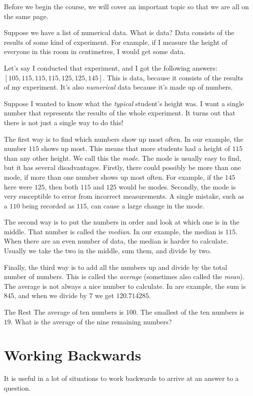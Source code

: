 \documentclass[a4paper,10pt]{report}
\begin{document}
Before we begin the course, we will cover an important topic so that we are all
on the same page.

Suppose we have a list of numerical data. What is data? Data  consists of the
results of some kind of experiment. For example, if I measure the height of
everyone in this room in centimetres, I would get some data.

Let's say I conducted that experiment, and I got the following answers: $[105,
115, 115, 115, 125, 125, 145]$. This is data, because it consists of the results
of my experiment. It's also \emph{numerical} data because it's made up of
numbers.

Suppose I wanted to know what the \emph{typical} student's height was. I want a
single number that represents the results of the whole experiment. It turns out
that there is not just a single way to do this!

The first way is to find which numbers show up most often. In our example, the
number $115$ shows up most. This means that more students had a height of $115$
than any other height. We call this the \emph{mode}. The mode is usually easy to
find, but it has several disadvantages. Firstly, there could possibly be more
than one mode, if more than one number shows up most often. For example, if the
$145$ here were $125$, then both $115$ and $125$ would be modes. Secondly, the
mode is very susceptible to error from incorrect measurements. A single mistake,
such as a $110$ being recorded as $115$, can cause a large change in the mode.

The second way is to put the numbers in order and look at which one is in the
middle. That number is called the \emph{median}. In our example, the median is
$115$. When there are an even number of data, the median is harder to calculate.
Usually we take the two in the middle, sum them, and divide by two.

Finally, the third way is to add all the numbers up and divide by the total
number of numbers. This is called the \emph{average} (sometimes also called the
\emph{mean}). The average is not always a nice number to calculate. In are
example, the sum is $845$, and when we divide by $7$ we get
$120.\overline{714285}$.

\begin{problem}{The Rest}
 The average of ten numbers is $100$. The smallest of the ten numbers is $19$.
 What is the average of the nine remaining numbers?
\end{problem}

\section{Working Backwards}

It is useful in a lot of situations to work backwards to arrive at an answer to
a question.
\end{document}
